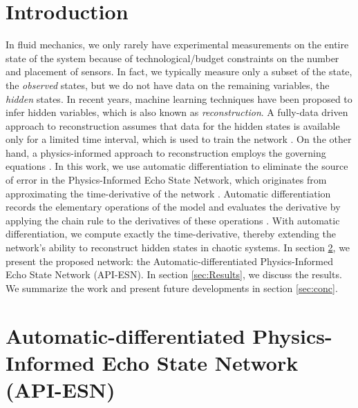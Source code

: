 \documentclass[runningheads]{llncs}
\begin{document}
\section{Introduction}
In fluid mechanics,  we only rarely have experimental measurements on the entire state of the system because of technological/budget constraints on the number and placement of sensors. In fact, we typically measure only a subset of the state, the \emph{observed} states, but we do not have data on the remaining variables, the \emph{hidden} states. 
In recent years, machine learning techniques have been proposed to infer hidden variables, which is also known as {\it reconstruction}. 
A fully-data driven approach to reconstruction assumes that data for the hidden states is available only for a limited time interval, which is used to train the network \cite{lu2017reservoir}. 
On the other hand, a physics-informed approach to reconstruction employs the governing equations \cite{doan2020learning,raissi2020hidden}. 
In this work, we use automatic differentiation to eliminate the source of error in the Physics-Informed Echo State Network, which  originates from approximating the time-derivative of the network \cite{doan2020learning}. Automatic differentiation records the elementary operations of the model and evaluates the derivative by applying the chain rule to the derivatives of these operations \cite{baydin2017automatic}. With automatic differentiation, we compute exactly the time-derivative, thereby extending the network's ability to reconstruct hidden states in chaotic systems.  
 In section \ref{sec:PIESN}, we present the proposed network: the Automatic-differentiated Physics-Informed Echo State Network (API-ESN). In section \ref{sec:Results}, we discuss the results. We summarize the work and present future developments in section \ref{sec:conc}. 

\section{Automatic-differentiated Physics-Informed Echo State Network (API-ESN)}

\label{sec:PIESN}
\end{document}
